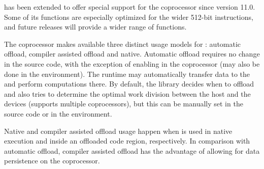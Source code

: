 \documentclass[../thesis]{subfiles}
\begin{document}
	\intel\mkl has been extended to offer special support for the \intel\xeonphi coprocessor since version 11.0. Some of its functions are especially optimized for the wider 512-bit \simd instructions, and future releases will provide a wider range of functions.

	The coprocessor makes available three distinct usage models for \mkl: automatic offload, compiler assisted offload and native. Automatic offload requires no change in the source code, with the exception of enabling \mkl in the coprocessor (may also be done in the environment). The runtime may automatically transfer data to the \xeonphi and perform computations there. By default, the library decides when to offload and also tries to determine the optimal work division between the host and the devices (\mkl supports multiple coprocessors), but this can be manually set in the source code or in the environment.

	Native and compiler assisted offload usage happen when \mkl is used in native execution and inside an offloaded code region, respectively. In comparison with automatic offload, compiler assisted offload has the advantage of allowing for data persistence on the coprocessor.
\end{document}
